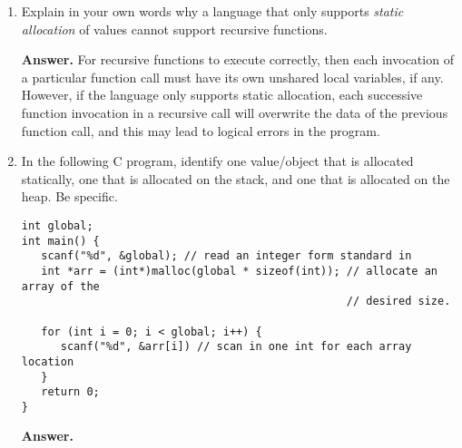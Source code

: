 \documentclass[9pt]{article}
\begin{document}
\begin{enumerate}
\begin{center}
      \end{center}
   \item Explain in your own words why a language that only supports
         \textit{static allocation} of values cannot support recursive
         functions.
         
      \textbf{Answer.} For recursive functions to execute correctly, then each
      invocation of a particular function call must have its own unshared
      local variables, if any. However, if the language only supports static
      allocation, each successive function invocation in a recursive call will
      overwrite the data of the previous function call, and this may lead to
      logical errors in the program.
   \item In the following C program, identify one value/object that is allocated
         statically, one that is allocated on the stack, and one that is
         allocated on the heap. Be specific.

         \begin{verbatim}
int global;
int main() {
   scanf("%d", &global); // read an integer form standard in
   int *arr = (int*)malloc(global * sizeof(int)); // allocate an array of the
                                                  // desired size.

   for (int i = 0; i < global; i++) {
      scanf("%d", &arr[i]) // scan in one int for each array location
   }
   return 0;
}
         \end{verbatim}

      \textbf{Answer.}


\end{enumerate}
\end{document}
